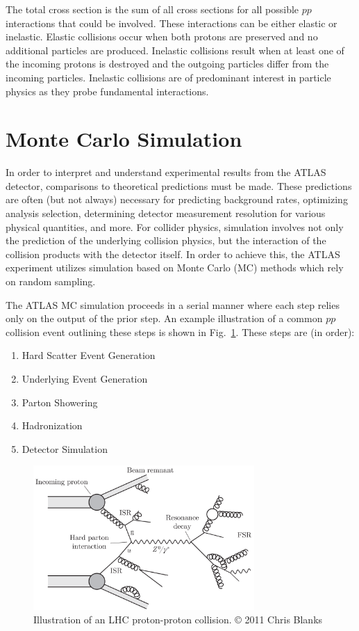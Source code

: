 The total cross section is the sum of all cross sections for all possible $pp$ interactions that could be involved.
These interactions can be either elastic or inelastic.
Elastic collisions occur when both protons are preserved and no additional particles are produced.
Inelastic collisions result when at least one of the incoming protons is destroyed and the outgoing particles differ from the incoming particles.
Inelastic collisions are of predominant interest in particle physics as they probe fundamental interactions.

\section{Monte Carlo Simulation}
\label{sec:monte_carlo}
In order to interpret and understand experimental results from the ATLAS detector, comparisons to theoretical predictions must be made.
These predictions are often (but not always) necessary for predicting background rates, optimizing analysis selection, determining detector measurement resolution for various physical quantities, and more.
For collider physics, simulation involves not only the prediction of the underlying collision physics, but the interaction of the collision products with the detector itself.
In order to achieve this, the ATLAS experiment utilizes simulation based on Monte Carlo (MC) methods which rely on random sampling.

The ATLAS MC simulation proceeds in a serial manner where each step relies only on the output of the prior step.
An example illustration of a common $pp$ collision event outlining these steps is shown in Fig.~\ref{fig:pp_interaction}.
These steps are (in order):
\begin{enumerate}
    \itemsep0em 
    \item Hard Scatter Event Generation
    \item Underlying Event Generation
    \item Parton Showering
    \item Hadronization
    \item Detector Simulation
\end{enumerate}

\begin{figure}
	\centering
	\includegraphics[width=0.75\textwidth]{pp_interaction}
	\caption{Illustration of an LHC proton-proton collision. © 2011 Chris Blanks}
	\label{fig:pp_interaction}
\end{figure}


